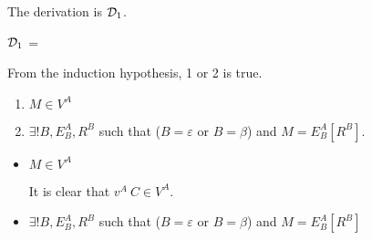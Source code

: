 \begin{itemize}
\begin{itemize}
	      	      The derivation is $\mathcal{D}_1$.
	      	      	      	      	      	      	      	      	      	      	      	      	      	      	      	      		      	      	      	      	      	      	      	      
	      	      $\mathcal{D}_1$ = 
	      	      {}
	      	      	      	      	      	      	      	      	      	      	      	      	      	      	      	      		      	      	      	      	      	      	      	      
	      	      From the induction hypothesis, 1 or 2 is true.
	      	      	      	      	      	      	      	      	      	      	      	      	      	      	      	      		      	      	      	      	      	      	      	      
	      	      \begin{enumerate}
	      	      	\item $ M \in V^A$
	      	      	\item $\exists ! B, E^A_B, R^B$ such that ($B = \varepsilon$ or $B = \beta$) and $M = E^A_B[R^B]$.
	      	      \end{enumerate}
	      	      	      	      	      	      	      	      	      	      	      	      	      	      	      	      		      	      	      	      	      	      	      	      
	      	      \begin{itemize}
	      	      	\item $ M \in V^A$
	      	      	      	      	      	      	      	      	      	      	      	      	      	      	      	      	      	      	      	      	      	      	      	      		      	      	      	      	      	      	      	      	      	      	      	      
	      	      	      It is clear that $v^A\ C \in V^A$.
	      	      	      	      	      	      	      	      	      	      	      	      	      	      	      	      	      	      	      	      	      	      	      	      		      	      	      	      	      	      	      	      	      	      	      	      
	      	      	\item $\exists ! B, E^A_B, R^B$ such that ($B = \varepsilon$ or $B = \beta$) and $M = E^A_B[R^B]$
	      	      	      	      	      	      	      	      	      	      	      	      	      	      	      	      	      	      	      	      	      	      	      	      		      	      	      	      	      	      	      	      	      	      	      	      

\end{itemize}
\end{itemize}
\end{itemize}
